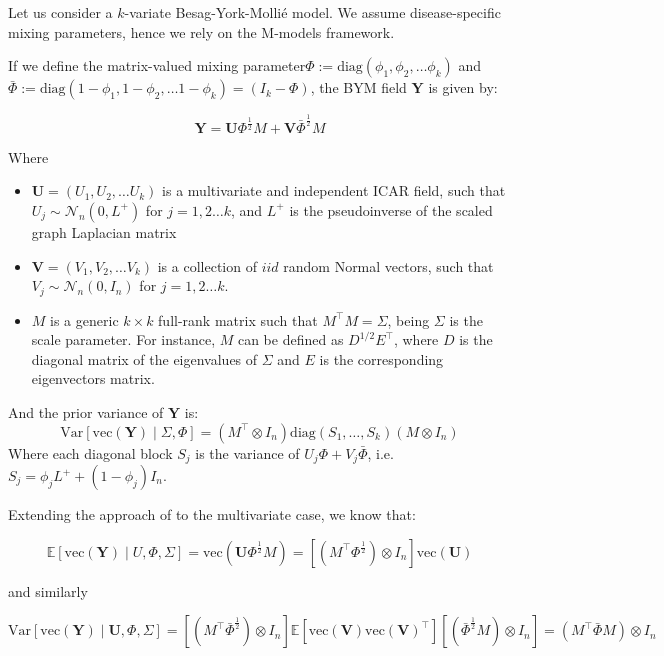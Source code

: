 \documentclass{article}
\begin{document}
Let us consider a $k$-variate Besag-York-Mollié model. We assume disease-specific mixing parameters, hence we rely on the M-models \cite{MMod} framework. 

If we define the matrix-valued mixing parameter$\Phi:=\mathrm{diag}( \phi_1, \phi_2, \dots  \phi_k )$ and $\bar{\Phi}:= \mathrm{diag} ( 1 - \phi_1,  1 - \phi_2 , \dots  1 - \phi_k) = (I_k -  \Phi ) $, the BYM field $\mathbf{Y}$ is given by:

\begin{equation}
\label{eq:Mmod_conv}
\mathbf{Y} =     \mathbf{U} \Phi^{\frac{1}{2}} M  + \mathbf{V} \bar{\Phi}^{\frac{1}{2}}M
\end{equation}

Where  \begin{itemize}
\item $\mathbf{U} = (U_1, U_2, \dots U_k)$ is a multivariate and independent ICAR field, such that $U_j \sim \mathcal{N}_n(0, L^+)$ for $j = 1, 2 \dots k$, and $L^+$ is the pseudoinverse of the scaled graph Laplacian matrix
\item $\mathbf{V} = (V_1, V_2, \dots V_k)$ is a collection of $iid$ random Normal vectors, such that $V_j \sim \mathcal{N}_n(0, I_n)$ for $j = 1, 2 \dots k$.
\item $M$ is a generic $k \times k$ full-rank matrix such that $M^\top M = \Sigma$, being $\Sigma$ is the scale parameter. For instance, $M$ can be defined as $D^{1/2} E^\top$, where $D$ is the diagonal matrix of the eigenvalues of $\Sigma$ and $E$ is the corresponding eigenvectors matrix.

\end{itemize}
And the prior variance of $\mathbf{Y}$ is:
$$
\mathrm{Var}\left[ \mathrm{vec}(\mathbf{Y}) \mid \Sigma, \Phi \right] = 
\left( M^\top \otimes I_n\right) 
\mathrm{diag}\left(S_1,\ldots,S_k\right)
\left( M \otimes I_n \right)
$$
Where each diagonal block $S_j$ is the variance of $U_j \Phi + V_j \bar{\Phi}$, i.e. $S_j = \phi_j L^+ + (1-\phi_j) I_n$. 



Extending the approach of \cite{BYM2} to the multivariate case, we know that:

$$
\mathbb{E} [\mathrm{vec}(\mathbf{Y}) \mid U, \Phi , \Sigma] = \mathrm{vec}(\mathbf{U} \Phi^{\frac{1}{2}}M) =
[( M^{\top}\Phi^{\frac{1}{2}}) \otimes I_n] \mathrm{vec}(\mathbf{U})
$$

and similarly

$$
\mathrm{Var} [\mathrm{vec}(\mathbf{Y}) \mid \mathbf{U}, \Phi , \Sigma] =
\left[( M^{\top} \bar{\Phi}^{\frac{1}{2}}) \otimes I_n \right] 
\mathbb{E} \left[
\mathrm{vec}(\mathbf{V})
\mathrm{vec}(\mathbf{V})^\top \right]
\left[(\bar{\Phi}^{\frac{1}{2}} M) \otimes I_n \right] = 
\left(
 M^\top \bar{\Phi}  M \right) \otimes I_n
$$
\end{document}
